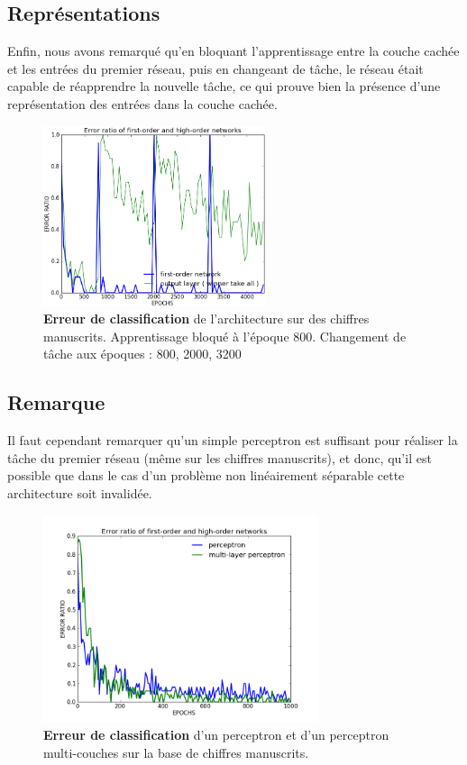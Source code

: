 \documentclass[a4paper,12pt, twoside]{article}
\begin{document}
\subsection{Représentations}

Enfin, nous avons remarqué qu'en bloquant l'apprentissage entre la couche cachée et les 
entrées du premier réseau, puis en changeant de tâche, le réseau était capable de réapprendre
la nouvelle tâche, ce qui prouve bien la présence d'une représentation des entrées dans la couche 
cachée.

\begin{figure}[H]
\begin{center}
 \includegraphics[height=200px]{../cleeremans_2007/digit_reco/err_handwritten_relearn_2.png}
\end{center}
\caption{ \textbf{Erreur de classification} de l'architecture sur des chiffres manuscrits.
Apprentissage bloqué à l'époque 800. Changement de tâche aux époques : 800, 2000, 3200}
\end{figure}

\subsection{Remarque}

Il faut cependant remarquer qu'un simple perceptron est suffisant pour réaliser la tâche
du premier réseau (même sur les chiffres manuscrits), et donc, qu'il est possible que 
dans le cas d'un problème non linéairement séparable cette architecture soit invalidée.
 
\begin{figure}[H]
\begin{center}
 \includegraphics[height=230px]{../cleeremans_2007/digit_reco/p_vs_mlp.png}
\end{center}
\caption{ \textbf{Erreur de classification} d'un perceptron et d'un perceptron multi-couches
sur la base de chiffres manuscrits.}
\end{figure}
\end{document}
